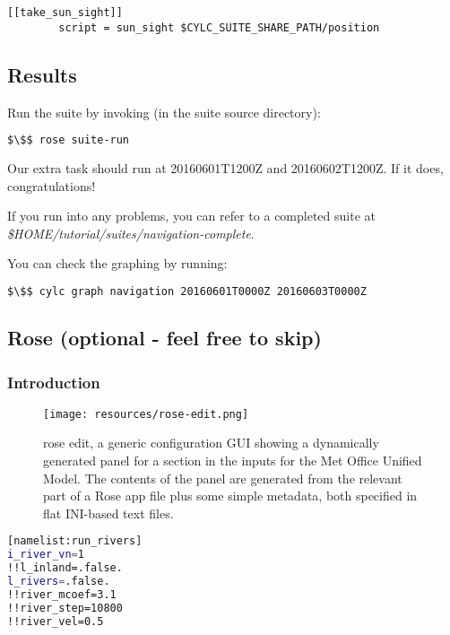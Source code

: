 \lstset{language=suiterc}
\begin{lstlisting}[columns=fullflexible]
    [[take_sun_sight]]
        script = sun_sight $CYLC_SUITE_SHARE_PATH/position
\end{lstlisting}

\subsection{Results}

Run the suite by invoking (in the suite source directory):
\begin{lstlisting}[mathescape, language=bash]
$\$$ rose suite-run
\end{lstlisting}

Our extra task should run at 20160601T1200Z and 20160602T1200Z. If it does, congratulations!

If you run into any problems, you can refer to a completed suite at {\em \$HOME/tutorial/suites/navigation-complete}.

You can check the graphing by running:

\begin{lstlisting}[mathescape, language=bash]
$\$$ cylc graph navigation 20160601T0000Z 20160603T0000Z
\end{lstlisting}

\subsection{Rose (optional - feel free to skip)}
\label{Rose}

\subsubsection{Introduction}

\begin{figure}[h]
\texttt{[image: resources/rose-edit.png]}
\caption{rose edit, a generic configuration GUI showing a dynamically generated panel for a section in the inputs for the Met Office Unified Model. The contents of the panel are generated from the relevant part of a Rose app file plus some simple metadata, both specified in flat INI-based text files. \label{rose edit}}
\end{figure}

\begin{lstlisting}[mathescape, language=bash, title={rose-app.conf snippet used to drive Figure~\ref{rose edit}}]
[namelist:run_rivers]
i_river_vn=1
!!l_inland=.false.
l_rivers=.false.
!!river_mcoef=3.1
!!river_step=10800
!!river_vel=0.5
\end{lstlisting}

